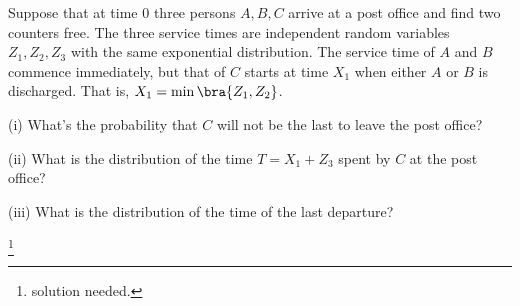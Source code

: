 \begin{problem}
Suppose that at time 0 three  persons $A,B,C$ arrive at a post office and find two counters free. The three service times are independent random variables $Z_1,Z_2,Z_3$ with the same exponential distribution. The service time of $A$ and $B$ commence immediately, but that of $C$ starts at time $X_1$ when either $A$ or $B$ is discharged. That is, $X_1 = \min\bra{Z_1,Z_2}$.
\ben
\item [(i)] What's the probability that $C$ will not be the last to leave the post office?
\item [(ii)] What is the distribution of the time $T=X_1+Z_3$ spent by $C$ at the post office?
\item [(iii)] What is the distribution of the time of the last departure?
\een
\end{problem}

\begin{solution}[\bf Proof]
\footnote{solution needed.}
\end{solution}
